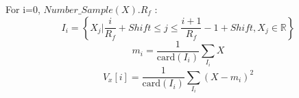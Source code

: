 For  i=$0$, $Number\_Sample(X). R_f$ :
\[
I_i = \left\{X_j | \frac{i}{R_f} + Shift \leq j \le \frac{i+1}{R_f} -1 + Shift,
 X_j \in \mathbb{R}\right\}
\]
\[
m_i = \frac{1}{\mathrm{card}(I_i)} \sum_{I_i} X
\]
\[
V_x[i] = \frac{1}{\mathrm{card}(I_i)} \sum_{I_i} (X -m_i)^2
\]
